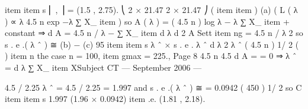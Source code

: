 item  %
item s ⎜
,
⎟ = (1.5 , 2.75).
⎝ 2 × 21.47 2 × 21.47 ⎠
(%
item %
item )
(a)
(
L ( λ ) ∝ λ 4.5 n exp −λ ∑ X_{%
item }
)
so
A ( λ ) = ( 4.5 n ) log λ − λ ∑ X_{%
item } + constant
⇒
d A
= 4.5 n / λ − ∑ X_{%
item }
d λ
d 2 A
Sett%
item ng
= 4.5 n / λ 2 so s . e .( λ ˆ ) ≅
(b) −
(c) 95%
item  %
item s λ ˆ  × s . e . λ ˆ
d λ
2
{
λ ˆ
( 4.5 n ) 1/ 2
( ) }
item n the case n = 100, \s%
item gmax = 225.,
Page 8
4.5 n 4.5
d A
=
= 0 ⇒ λ ˆ =
d λ
∑ X_{%
item } XSubject CT  — September 2006 — 

4.5 / 2.25
λ ˆ = 4.5 / 2.25 = 1.997 and s . e .( λ ˆ ) ≅
= 0.0942
( 450 ) 1/ 2
so C%
item  %
item s 1.997 \pm(1.96 × 0.0942) %
item .e. (1.81 , 2.18).
